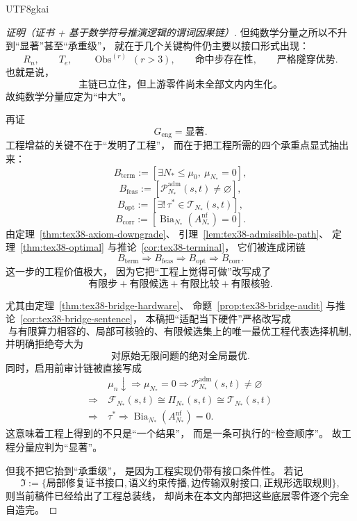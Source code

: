 \documentclass[12pt]{article}
\newcommand{\Bia}{\operatorname{Bia}}
\newcommand{\Obs}{\operatorname{Obs}}
\begin{document}
\begin{CJK*}{UTF8}{gkai}
\begin{proof}[证明（证书 + 基于数学符号推演逻辑的谓词因果链）]
但纯数学分量之所以不升到“显著”甚至“承重级”，
就在于几个关键构件仍主要以接口形式出现：
\[
  R_n,\qquad
  T_e,\qquad
  \Obs^{(r)}\ (r>3),\qquad
  \text{命中步存在性},\qquad
  \text{严格隧穿优势}.
\]
也就是说，
\[
  \text{主链已立住，但上游零件尚未全部文内内生化。}
\]
故纯数学分量应定为“中大”。

再证
\[
  G_{\mathrm{eng}}=\text{显著}.
\]
工程增益的关键不在于“发明了工程”，
而在于把工程所需的四个承重点显式抽出来：
\[
  B_{\mathrm{term}}
  :=[\exists N_\ast\le \mu_0,\ \mu_{N_\ast}=0],
\]
\[
  B_{\mathrm{feas}}
  :=[\mathcal P^{\mathrm{adm}}_{N_\ast}(s,t)\neq\varnothing],
\]
\[
  B_{\mathrm{opt}}
  :=[\exists!\,\tau^\ast\in\mathcal T_{N_\ast}(s,t)],
\]
\[
  B_{\mathrm{corr}}
  :=[\Bia_{N_\ast}(A_{N_\ast}^{\mathrm{nf}})=0].
\]
由定理~\ref{thm:tex38-axiom-downgrade}、
引理~\ref{lem:tex38-admissible-path}、
定理~\ref{thm:tex38-optimal} 与推论~\ref{cor:tex38-terminal}，
它们被连成闭链
\[
  B_{\mathrm{term}}
  \Rightarrow
  B_{\mathrm{feas}}
  \Rightarrow
  B_{\mathrm{opt}}
  \Rightarrow
  B_{\mathrm{corr}}.
\]
这一步的工程价值极大，
因为它把“工程上觉得可做”改写成了
\[
  \text{有限步}
  +
  \text{有限候选}
  +
  \text{有限比较}
  +
  \text{有限核验}.
\]

尤其由定理~\ref{thm:tex38-bridge-hardware}、
命题~\ref{prop:tex38-bridge-audit} 与推论~\ref{cor:tex38-bridge-sentence}，
本稿把“适配当下硬件”严格改写成
\[
  \text{与有限算力相容的、局部可核验的、有限候选集上的唯一最优工程代表选择机制},
\]
并明确拒绝夸大为
\[
  \text{对原始无限问题的绝对全局最优}.
\]
同时，启用前审计链被直接写成
\[
  \begin{aligned}
    &\mu_n\downarrow
    \Rightarrow
    \mu_{N_\ast}=0
    \Rightarrow
    \mathcal P^{\mathrm{adm}}_{N_\ast}(s,t)\neq\varnothing\\
    \Rightarrow\ &
    \mathcal F_{N_\ast}(s,t)\cong\Pi_{N_\ast}(s,t)\cong\mathcal T_{N_\ast}(s,t)\\
    \Rightarrow\ &
    \tau^\ast
    \Rightarrow
    \Bia_{N_\ast}(A_{N_\ast}^{\mathrm{nf}})=0.
  \end{aligned}
\]
这意味着工程上得到的不只是“一个结果”，
而是一条可执行的“检查顺序”。
故工程分量应判为“显著”。

但我不把它抬到“承重级”，
是因为工程实现仍带有接口条件性。
若记
\[
  \mathfrak I
  :=
  \{
    \text{局部修复证书接口},
    \text{语义约束传播},
    \text{边传输双射接口},
    \text{正规形选取规则}
  \},
\]
则当前稿件已经给出了工程总装线，
却尚未在本文内部把这些底层零件逐个完全自造完。


\end{proof}
\end{CJK*}
\end{document}
